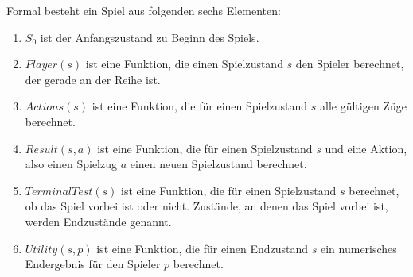 Formal besteht ein Spiel aus folgenden sechs Elementen:
\begin{enumerate}
    \item $S_0$ ist der Anfangszustand zu Beginn des Spiels.
    \item $Player(s)$ ist eine Funktion, die einen Spielzustand $s$ den Spieler berechnet, der gerade an der Reihe ist.
    \item $Actions(s)$ ist eine Funktion, die für einen Spielzustand $s$ alle gültigen Züge berechnet.
    \item $Result(s, a)$ ist eine Funktion, die für einen Spielzustand $s$ und eine Aktion, also einen Spielzug $a$ einen neuen Spielzustand berechnet.
    \item $TerminalTest(s)$ ist eine Funktion, die für einen Spielzustand $s$ berechnet, ob das Spiel vorbei ist oder nicht. Zustände, an denen das Spiel vorbei ist, werden Endzustände genannt.
    \item $Utility(s, p)$ ist eine Funktion, die für einen Endzustand $s$ ein numerisches Endergebnis für den Spieler $p$ berechnet.
\end{enumerate}
